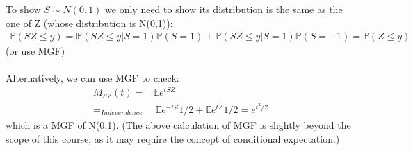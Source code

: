 

\setcounter{theorem}{29}
\begin{exercise}[BH.5.30]
\begin{solution}
    To show $S\sim N(0,1)$ we only need to show its distribution is the same as the one of Z (whose distribution is N(0,1)):
	\begin{align*}
		\mathbb{P}\left(SZ\leq y \right) = \mathbb{P}\left(SZ\leq y|S=1 \right)\mathbb{P}(S=1)+\mathbb{P}\left(SZ\leq y|S=1 \right)\mathbb{P}(S=-1) =\mathbb{P}\left(Z\leq y\right) 
	\end{align*}
	(or use MGF)
	\\~~\\
	Alternatively, we can use MGF to check:
	\begin{align*}
		M_{SZ}(t) =& \mathbb{E}e^{tSZ} \\
		=_{\textit{Independence}}&~ \mathbb{E}e^{-tZ} 1/2 + \mathbb{E}e^{tZ} 1/2 = e^{t^2/2} 
	\end{align*}
	which is a MGF of N(0,1). (The above calculation of MGF is slightly beyond the scope of this course, as it may require the concept of conditional expectation.)
\end{solution}
\end{exercise}


